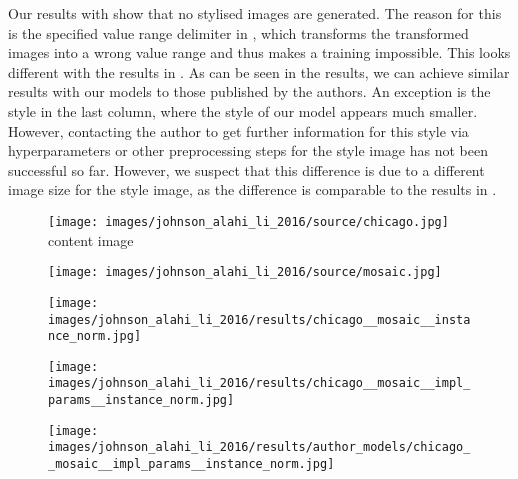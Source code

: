 Our results with \paper{} show that no stylised images are generated. The reason for this is the specified value range delimiter in \paper{}, which transforms the transformed images into a wrong value range and thus makes a training impossible. This looks different with the results in \implementation{}. As can be seen in the results, we can achieve similar results with our models to those published by the authors. An exception is the style in the last column, where the style of our model appears much smaller. However, contacting the author to get further information for this style via hyperparameters or other preprocessing steps for the style image has not been successful so far. However, we suspect that this difference is due to a different image size for the style image, as the difference is comparable to the results in .
\begin{figure}[H]
	\centering
	\begin{minipage}[t]{0.24\textwidth}
		\centering
		\texttt{[image: images/johnson\_alahi\_li\_2016/source/chicago.jpg]}\\
		content image
	\end{minipage}
	\hfill%
	\begin{minipage}[t]{0.24\textwidth}
		\centering
		\hfill
	\end{minipage}
	\hfill%
	\begin{minipage}[t]{0.24\textwidth}
		\centering
		\hfill
	\end{minipage}
	\hfill%
	\begin{minipage}[t]{0.24\textwidth}
		\centering
		\hfill
	\end{minipage}
	\hfill%
	\begin{minipage}[t]{0.24\textwidth}
		\centering
		\texttt{[image: images/johnson\_alahi\_li\_2016/source/mosaic.jpg]}
	\end{minipage}
	\hfill%
	\begin{minipage}[t]{0.24\textwidth}
		\centering
		\texttt{[image: images/johnson\_alahi\_li\_2016/results/chicago\_\_mosaic\_\_instance\_norm.jpg]}
	\end{minipage}
	\hfill%
	\begin{minipage}[t]{0.24\textwidth}
		\centering
		\texttt{[image: images/johnson\_alahi\_li\_2016/results/chicago\_\_mosaic\_\_impl\_params\_\_instance\_norm.jpg]}
	\end{minipage}
	\hfill%
	\begin{minipage}[t]{0.24\textwidth}
		\centering
		\texttt{[image: images/johnson\_alahi\_li\_2016/results/author\_models/chicago\_\_mosaic\_\_impl\_params\_\_instance\_norm.jpg]}

\end{minipage}
\end{figure}
